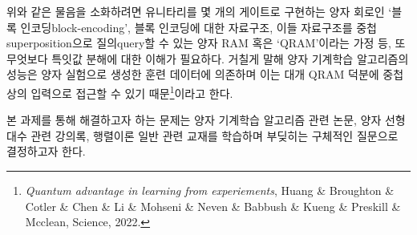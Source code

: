 \documentclass[a4paper,hidelinks]{oblivoir}
\begin{document}
위와 같은 물음을 소화하려면 유니타리를 몇 개의 게이트로 구현하는 양자 회로인 
`블록 인코딩{\footnotesize block-encoding}', 블록 인코딩에 대한 자료구조, 이들
자료구조를 중첩{\tiny superposition}으로 질의{\tiny query}할 수 있는 양자 RAM
혹은 `QRAM'이라는 가정 등, 또 무엇보다 특잇값 분해에 대한 이해가 필요하다.
거칠게 말해 양자 기계학습 알고리즘의 성능은 양자 실험으로 생성한 훈련 데이터에
의존하며 이는 대개 QRAM 덕분에 중첩상의 입력으로 접근할 수 있기 
때문\footnote{\emph{Quantum advantage in learning from experiements}, Huang \&
Broughton \& Cotler \& Chen \& Li \& Mohseni \& Neven \& Babbush \& Kueng \&
Preskill \& Mcclean, Science, 2022.}이라고 한다.

본 과제를 통해 해결하고자 하는 문제는 양자 기계학습 알고리즘 관련 논문,
양자 선형대수 관련 강의록, 행렬이론 일반 관련 교재를 학습하며 부딪히는
구체적인 질문으로 결정하고자 한다.
\end{document}
